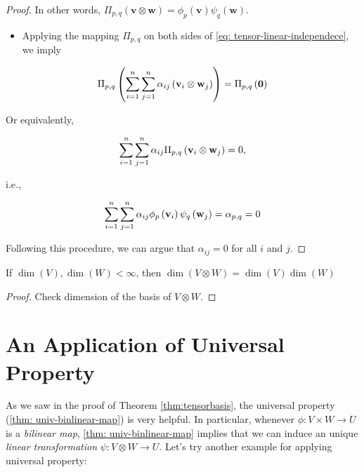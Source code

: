 \begin{proof}
In other words, \(\Pi_{p,q}\left( {\mathbf{v} \otimes  \mathbf{w}}\right)  = {\phi }_{p}\left( \mathbf{v}\right) {\psi }_{q}\left( \mathbf{w}\right)\).

\begin{itemize}
\item Applying the mapping \({\Pi }_{p,q}\) on both sides of \autoref{eq: tensor-linear-independece}, we imply
\end{itemize}

\[
{\Pi }_{p,q}\left( {\mathop{\sum }\limits_{{i = 1}}^n\mathop{\sum }\limits_{{j = 1}}^n\alpha_{ij}\left( {{\bf v}_{i} \otimes  {\bf w}_{j}}\right) }\right)  = {\Pi }_{p,q}\left( \mathbf{0}\right)
\]

Or equivalently,

\[
\mathop{\sum }\limits_{{i = 1}}^n\mathop{\sum }\limits_{{j = 1}}^n\alpha_{ij}{\Pi }_{p,q}\left( {{\bf v}_{i} \otimes  {\bf w}_{j}}\right)  = 0,
\]

i.e.,

\[
\mathop{\sum }\limits_{{i = 1}}^n\mathop{\sum }\limits_{{j = 1}}^n\alpha_{ij}{\phi }_{p}\left( {\bf v}_{i}\right) {\psi }_{q}\left( {\bf w}_{j}\right)  = \alpha_{p,q} = 0
\]

Following this procedure, we can argue that \(\alpha_{ij} = 0\) for all $i$ and \(j\).
\end{proof}

\begin{corollary} If \(\dim \left( V\right) ,\dim \left( W\right)  < \infty\), then \(\dim \left( {V \otimes  W}\right)  = \dim \left( V\right) \dim \left( W\right)\)
\end{corollary}

\begin{proof} Check dimension of the basis of \(V \otimes  W\).
\end{proof}

\section{An Application of Universal Property}
As we saw in the proof of Theorem \ref{thm:tensorbasis}, the universal property (\autoref{thm: univ-binlinear-map}) is very helpful. In particular, whenever \(\phi  : V \times  W \rightarrow  U\) is a {\it bilinear map}, \autoref{thm: univ-binlinear-map} implies that we can induce an unique {\it linear transformation} \(\psi  : V \otimes  W \rightarrow  U\). Let's try another example for applying universal property: 

